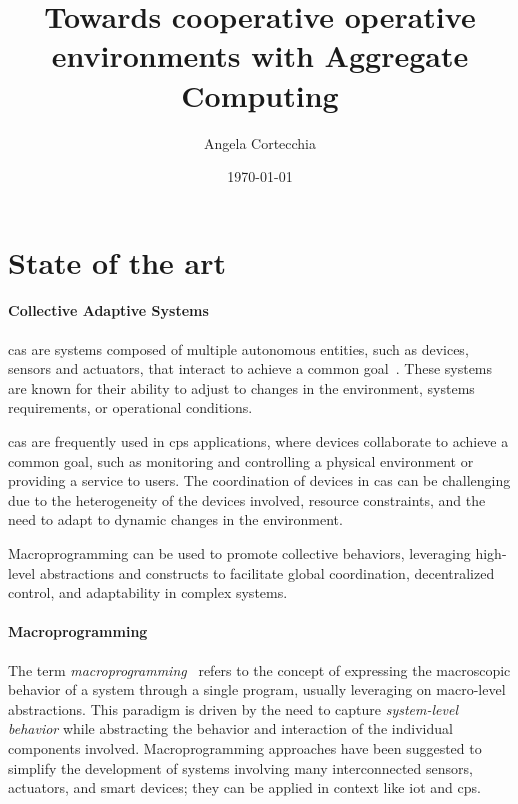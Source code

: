 \documentclass[12pt, a4paper]{article}
\begin{document}
\title{Towards cooperative operative environments with Aggregate Computing}
\author{Angela Cortecchia}
\date{\today}
\maketitle
%

\section{State of the art}\label{sec:state-of-the-art}
\paragraph{Collective Adaptive Systems}

\ac{cas} are systems composed of multiple autonomous entities, such as devices, sensors and actuators,
that interact to achieve a common goal~\cite{ferscha2015}.
%
These systems are known for their ability to adjust to changes in the environment,
systems requirements, or operational conditions.

\ac{cas} are frequently used in \ac{cps} applications,
where devices collaborate to achieve a common goal,
such as monitoring and controlling a physical environment or providing a service to users.
%
The coordination of devices in \ac{cas} can be challenging due to the heterogeneity of the devices involved,
resource constraints, and the need to adapt to dynamic changes in the environment.

Macroprogramming can be used to promote collective behaviors,
leveraging high-level abstractions and constructs to facilitate global coordination,
decentralized control, and adaptability in complex systems.


\paragraph{Macroprogramming}
The term \emph{macroprogramming}~\cite{casadei2023} refers to the concept of expressing the macroscopic behavior of a system
through a single program,
usually leveraging on macro-level abstractions.
%
This paradigm is driven by the need to capture \emph{system-level behavior} while abstracting the behavior and interaction
of the individual components involved.
%
Macroprogramming approaches have been suggested to simplify the development of systems involving many interconnected sensors,
actuators, and smart devices;
they can be applied in context like \ac{iot} and \ac{cps}.
\end{document}
